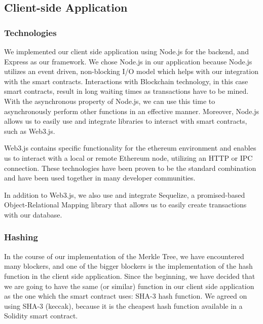 \subsection{Client-side Application}
\label{subsec:approach-implementation-client}

\subsubsection*{Technologies}

We implemented our client side application using Node.js for the backend, and Express as our framework. We chose Node.js in our application because Node.js utilizes an event driven, non-blocking I/O model which helps with our integration with the smart contracts. Interactions with Blockchain technology, in this case smart contracts, result in long waiting times as transactions have to be mined. With the asynchronous property of Node.js, we can use this time to asynchronously perform other functions in an effective manner. Moreover, Node.js allows us to easily use and integrate libraries to interact with smart contracts, such as Web3.js.

Web3.js contains specific functionality for the ethereum environment and enables us to interact with a local or remote Ethereum node, utilizing an HTTP or IPC connection. These technologies have been proven to be the standard combination and have been used together in many developer communities. 

In addition to Web3.js, we also use and integrate Sequelize, a promised-based Object-Relational Mapping library that allows us to easily create transactions with our database.

\subsubsection*{Hashing}

In the course of our implementation of the Merkle Tree, we have encountered many blockers, and one of the bigger blockers is the implementation of the hash function in the client side application. Since the beginning, we have decided that we are going to have the same (or similar) function in our client side application as the one which the smart contract uses: SHA-3 hash function. We agreed on using SHA-3 (keccak), because it is the cheapest hash function available in a Solidity smart contract. 

